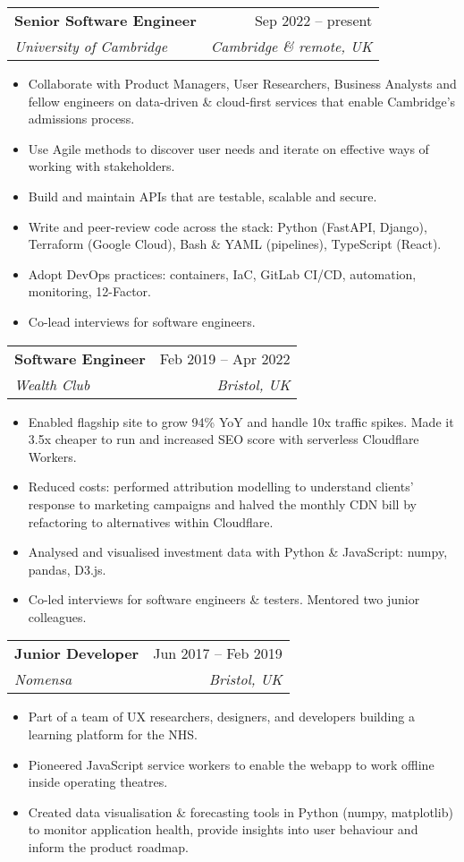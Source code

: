 \documentclass[a4paper,12pt]{article}
\makeatletter
\newcommand{\resumeItem}[1]{
  \item\small{
    {#1 \vspace{-2pt}}
  }
}
\newcommand{\resumeSubheading}[4]{
  \vspace{-2pt}\item
    \begin{tabular*}{0.97\textwidth}[t]{l@{\extracolsep{\fill}}r}
      \textbf{#1} & #2 \\
      \textit{\small#3} & \textit{\small #4} \\
    \end{tabular*}\vspace{-7pt}
}
\newcommand{\resumeItemListStart}{\begin{itemize}}
\newcommand{\resumeItemListEnd}{\end{itemize}\vspace{-5pt}}
\makeatother
\begin{document}
    \resumeSubheading
      {Senior Software Engineer}{Sep 2022 -- present}
      {University of Cambridge}{Cambridge \& remote, UK}
      \vspace{0pt}
    \resumeItemListStart
        \resumeItem{Collaborate with Product Managers, User Researchers, Business Analysts and fellow engineers on data-driven \& cloud-first services that enable Cambridge's admissions process.}
        \resumeItem{Use Agile methods to discover user needs and iterate on effective ways of working with stakeholders.}
        \resumeItem{Build and maintain APIs that are testable, scalable and secure.}
        \resumeItem{Write and peer-review code across the stack: Python (FastAPI, Django), Terraform (Google Cloud), Bash \& YAML (pipelines), TypeScript (React).}
        \resumeItem{Adopt DevOps practices: containers, IaC, GitLab CI/CD, automation, monitoring, 12-Factor.}
        \resumeItem{Co-lead interviews for software engineers.}
    \resumeItemListEnd
      \vspace{4pt}

    \resumeSubheading
      {Software Engineer}{Feb 2019 -- Apr 2022}
      {Wealth Club}{Bristol, UK}
      \vspace{0pt}
    \resumeItemListStart
        \resumeItem{Enabled flagship site to grow 94\% YoY and handle 10x traffic spikes. Made it 3.5x cheaper to run and increased SEO score with serverless Cloudflare Workers.}
        \resumeItem{Reduced costs: performed attribution modelling to understand clients' response to marketing campaigns and halved the monthly CDN bill by refactoring to alternatives within Cloudflare.}
        \resumeItem{Analysed and visualised investment data with Python \& JavaScript: numpy, pandas, D3.js.}
        \resumeItem{Co-led interviews for software engineers \& testers. Mentored two junior colleagues.}
    \resumeItemListEnd
      \vspace{4pt}

    \resumeSubheading
      {Junior Developer}{Jun 2017 -- Feb 2019}
      {Nomensa}{Bristol, UK}
      \vspace{0pt}
    \resumeItemListStart
        \resumeItem{Part of a team of UX researchers, designers, and developers building a learning platform for the NHS.}
        \resumeItem{Pioneered JavaScript service workers to enable the webapp to work offline inside operating theatres.}
        \resumeItem{Created data visualisation \& forecasting tools in Python (numpy, matplotlib) to monitor application health, provide insights into user behaviour and inform the product roadmap.}
    \resumeItemListEnd
\end{document}

